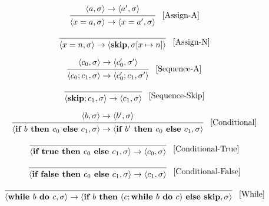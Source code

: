 \[
\begin{prooftree}
\hypo{
	\langle a, \sigma \rangle \rightarrow
	\langle a^\prime, \sigma \rangle 
} 
\infer1{
	\langle x = a, \sigma \rangle \rightarrow  
	\langle x = a^\prime, \sigma \rangle
}
\end{prooftree} \; \; \; [\text{Assign-A}]
\]


\[
\begin{prooftree}
\infer0{
	\langle x = n, \sigma \rangle \rightarrow  
	\langle \textbf{skip},  \sigma[x \mapsto n] \rangle
}
\end{prooftree} \; \; \; [\text{Assign-N}]
\]

\[
\begin{prooftree}
\hypo{
	\langle c_0, \sigma \rangle \rightarrow
	\langle c_0^\prime, \sigma^\prime \rangle 
} 
\infer1{
	\langle c_0; c_1,  \sigma \rangle \rightarrow  
	\langle c_0^\prime; c_1, \sigma^\prime \rangle
}
\end{prooftree} \; \; \; [\text{Sequence-A}]
\]

\[
\begin{prooftree}
\infer0{
	\langle \textbf{skip}; c_1,  \sigma \rangle \rightarrow  
	\langle c_1, \sigma \rangle
}
\end{prooftree} \; \; \; [\text{Sequence-Skip}]
\]

\[
\begin{prooftree}
\hypo{
	\langle b, \sigma \rangle \rightarrow
	\langle b^\prime, \sigma \rangle 
} 
\infer1{
	\langle \textbf{if } b \textbf{ then } c_0 \textbf{ else } c_1, \sigma   \rangle
	\rightarrow
	\langle \textbf{if } b^\prime \textbf{ then } c_0 \textbf{ else } c_1, \sigma  \rangle
}
\end{prooftree} \; \; \; [\text{Conditional}]
\]

\[
\begin{prooftree}
\infer0{
\langle \textbf{if } \textbf{true} \textbf{ then } c_0 \textbf{ else } c_1, \sigma  \rangle
\rightarrow
\langle c_0, \sigma \rangle 
}
\end{prooftree} \; \; \; [\text{Conditional-True}]
\]

\[
\begin{prooftree}
\infer0{
\langle \textbf{if } \textbf{false} \textbf{ then } c_0 \textbf{ else } c_1, \sigma  \rangle
\rightarrow
\langle c_1, \sigma \rangle 
}
\end{prooftree} \; \; \; [\text{Conditional-False}]
\]

\[
\begin{prooftree}
\infer0{
\langle \textbf{while } b \textbf{ do } c, \sigma \rangle
\rightarrow
\langle \textbf{if } b \textbf{ then } (c; \textbf{while } b \textbf{ do } c)
\textbf{ else } \textbf{skip}, \sigma \rangle
}
\end{prooftree} \; \; \; [\text{While}]
\]
